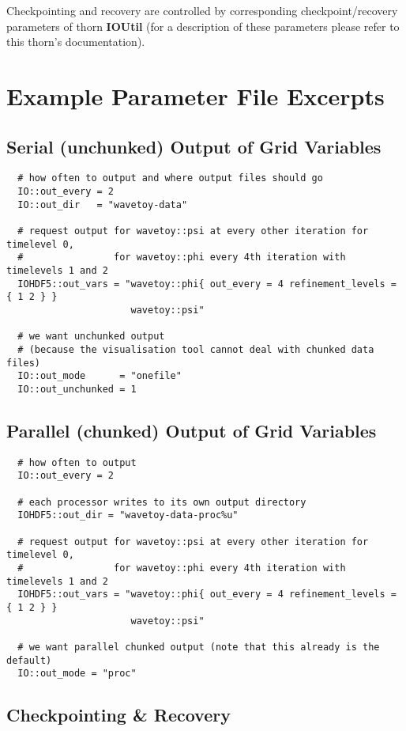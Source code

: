 \documentclass{article}
\begin{document}
Checkpointing and recovery are controlled by corresponding checkpoint/recovery
parameters of thorn {\bf IOUtil} (for a description of these parameters please
refer to this thorn's documentation).


\section{Example Parameter File Excerpts}

\subsection{Serial (unchunked) Output of Grid Variables}

\begin{verbatim}
  # how often to output and where output files should go
  IO::out_every = 2
  IO::out_dir   = "wavetoy-data"

  # request output for wavetoy::psi at every other iteration for timelevel 0,
  #                for wavetoy::phi every 4th iteration with timelevels 1 and 2
  IOHDF5::out_vars = "wavetoy::phi{ out_every = 4 refinement_levels = { 1 2 } }
                      wavetoy::psi"

  # we want unchunked output
  # (because the visualisation tool cannot deal with chunked data files)
  IO::out_mode      = "onefile"
  IO::out_unchunked = 1
\end{verbatim}

\subsection{Parallel (chunked) Output of Grid Variables}

\begin{verbatim}
  # how often to output
  IO::out_every = 2

  # each processor writes to its own output directory
  IOHDF5::out_dir = "wavetoy-data-proc%u"

  # request output for wavetoy::psi at every other iteration for timelevel 0,
  #                for wavetoy::phi every 4th iteration with timelevels 1 and 2
  IOHDF5::out_vars = "wavetoy::phi{ out_every = 4 refinement_levels = { 1 2 } }
                      wavetoy::psi"

  # we want parallel chunked output (note that this already is the default)
  IO::out_mode = "proc"
\end{verbatim}

\subsection{Checkpointing \& Recovery}
\end{document}
